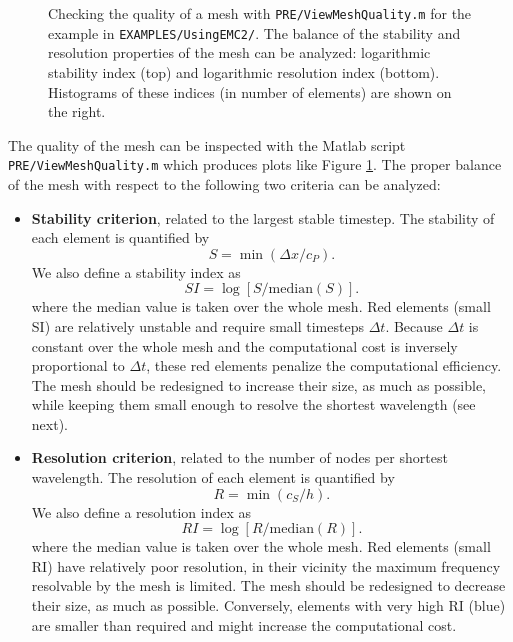 \begin{figure}
\caption{\label{Fig:stabres} Checking the quality of a mesh
with \texttt{PRE/ViewMeshQuality.m} for the example in \texttt{EXAMPLES/UsingEMC2/}.
The balance of the stability and resolution properties of the mesh can be analyzed:
logarithmic stability index (top) and logarithmic resolution index (bottom).
Histograms of these indices (in number of elements) are shown on the right.}
\end{figure}

The quality of the mesh can be inspected with
the Matlab script \texttt{PRE/ViewMeshQuality.m} which produces
plots like Figure \ref{Fig:stabres}.
The proper balance of the mesh with respect to the following
two criteria can be analyzed:

\begin{itemize}

\item {\bf Stability criterion}, related to the largest stable timestep. 
The stability of each element is quantified by
$$ S = \min(\Delta x/c_P). $$
We also define a stability index as 
$$ SI = \log[ S / \text{median}(S) ].$$
where the median value is taken over the whole mesh.
Red elements (small SI) are relatively unstable
and require small timesteps $\Delta t$.
Because $\Delta t$ is constant over the whole mesh
and the computational cost is inversely proportional to $\Delta t$,
these red elements penalize the computational efficiency.
The mesh should be redesigned to increase their size, as much as possible,
while keeping them small enough to resolve the shortest wavelength (see next).

\item {\bf Resolution criterion},
related to the number of nodes per shortest wavelength. 
The resolution of each element is quantified by
$$ R = \min(c_S / h). $$
We also define a resolution index as 
$$ RI = \log[ R / \text{median}(R) ].$$
where the median value is taken over the whole mesh.
Red elements (small RI) have relatively poor resolution,
in their vicinity the maximum frequency resolvable by the mesh is limited.
The mesh should be redesigned to decrease their size, as much as possible.
Conversely, elements with very high RI (blue) are smaller than required
and might increase the computational cost.

\end{itemize}


